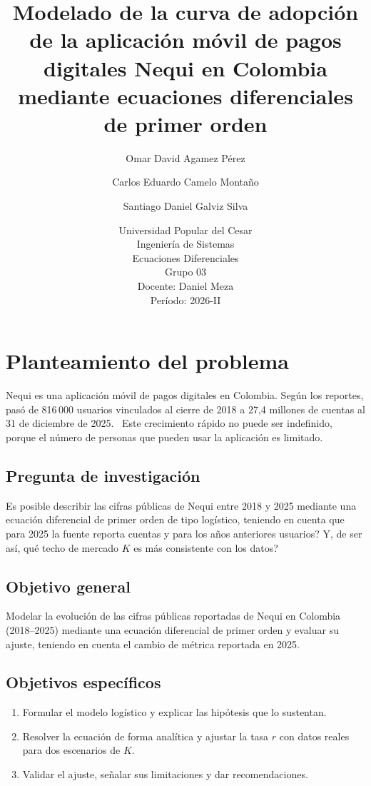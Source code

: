 \documentclass[12pt,a4paper]{article}
\title{Modelado de la curva de adopci\'on de la aplicaci\'on m\'ovil de pagos digitales Nequi en Colombia mediante ecuaciones diferenciales de primer orden}
\author{Omar David Agamez Pérez \and Carlos Eduardo Camelo Montaño \and Santiago Daniel Galviz Silva}
\date{Universidad Popular del Cesar \\ Ingenier\'ia de Sistemas \\ Ecuaciones Diferenciales \\ Grupo 03 \\ Docente: Daniel Meza \\ Per\'iodo: 2026-II}
\begin{document}
\maketitle

\section{Planteamiento del problema}

Nequi es una aplicaci\'on m\'ovil de pagos digitales en Colombia. Seg\'un los reportes, pas\'o de 816\,000 usuarios vinculados al cierre de 2018 a 27{,}4 millones de cuentas al 31 de diciembre de 2025.~\cite{nequi_6anos,nequi_somos,cibest4t25} Este crecimiento r\'apido no puede ser indefinido, porque el n\'umero de personas que pueden usar la aplicaci\'on es limitado.

\subsection{Pregunta de investigaci\'on}
\textquestiondown Es posible describir las cifras p\'ublicas de Nequi entre 2018 y 2025 mediante una ecuaci\'on diferencial de primer orden de tipo log\'istico, teniendo en cuenta que para 2025 la fuente reporta cuentas y para los a\~nos anteriores usuarios? Y, de ser as\'i, \textquestiondown qu\'e techo de mercado $K$ es m\'as consistente con los datos?

\subsection{Objetivo general}
Modelar la evoluci\'on de las cifras p\'ublicas reportadas de Nequi en Colombia (2018--2025) mediante una ecuaci\'on diferencial de primer orden y evaluar su ajuste, teniendo en cuenta el cambio de m\'etrica reportada en 2025.

\subsection{Objetivos espec\'ificos}
\begin{enumerate}
  \item Formular el modelo log\'istico y explicar las hip\'otesis que lo sustentan.
  \item Resolver la ecuaci\'on de forma anal\'itica y ajustar la tasa $r$ con datos reales para dos escenarios de $K$.
  \item Validar el ajuste, se\~nalar sus limitaciones y dar recomendaciones.
\end{enumerate}
\end{document}
